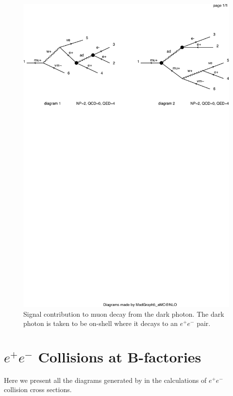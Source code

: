 \begin{figure}[h]
    \centering
    \includegraphics[width=\textwidth,clip=true,viewport=0 500 500 700]{Figures/madgraph_diagrams/mu_eeenunu_darkphoton.pdf}
    \caption{Signal contribution to muon decay from the dark photon. The dark photon is taken to be on-shell where it decays to an $e^+ e^-$ pair.}
    \label{fig:mu_eee_darkphoton}
\end{figure}

\section{$e^+ e^-$ Collisions at B-factories}
\label{app:ee_diagrams}
Here we present all the diagrams generated by \madgraph in the calculations of $e^+ e^-$ collision cross sections.

